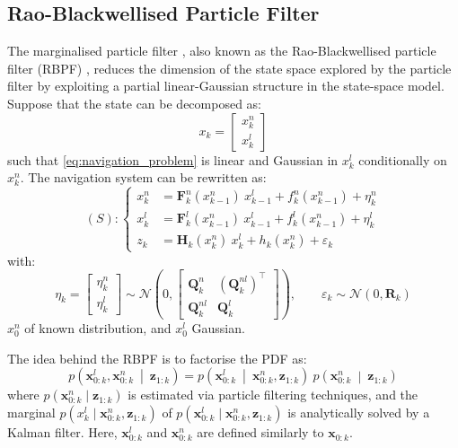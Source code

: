 \subsection{Rao-Blackwellised Particle Filter}

The marginalised particle filter \cite{bib:MPF}, also known as the Rao-Blackwellised particle filter (RBPF) \cite{bib:Rao-Blackwellisation,bib:RBPF}, reduces the dimension of the state space explored by the particle filter by exploiting a partial linear-Gaussian structure in the state-space model. Suppose that the state can be decomposed as:
\begin{equation}
	x_k=\begin{bmatrix}x_k^n\\x_k^l\end{bmatrix}
\end{equation}
such that \eqref{eq:navigation_problem} is linear and Gaussian in $x_k^l$ conditionally on $x_k^n$. The navigation system can be rewritten as:
\begin{equation}
	(S):\left\{\begin{aligned}
	x_k^n&=\mathbf{F}_k^n\left(x_{k-1}^n\right)\:x_{k-1}^l+f_k^n\left(x_{k-1}^n\right)+\eta_k^n\\
	x_k^l&=\mathbf{F}_k^l\left(x_{k-1}^n\right)\:x_{k-1}^l+f_k^l\left(x_{k-1}^n\right)+\eta_k^l\\
	z_k&=\mathbf{H}_k\left(x_k^n\right)\:x_k^l+h_k\left(x_k^n\right)+\varepsilon_k
	\end{aligned}\right.\label{eq:RBPF_model}
\end{equation}
with:
\begin{equation}
	\eta_k=\begin{bmatrix}\eta_k^n\\\eta_k^l\end{bmatrix}
	\sim\mathcal{N}\left(0,\begin{bmatrix}
	\mathbf{Q}_k^n&(\mathbf{Q}_k^{nl})^\top\\\mathbf{Q}_k^{nl}&\mathbf{Q}_k^l
	\end{bmatrix}\right),\qquad \varepsilon_k\sim\mathcal{N}(0,\mathbf{R}_k)
\end{equation}
$x_0^n$ of known distribution, and $x_0^l$ Gaussian.

The idea behind the RBPF is to factorise the PDF as:
\begin{equation}
	p\left(\mathbf{x}_{0:k}^l,\mathbf{x}_{0:k}^n\:\middle|\:\mathbf{z}_{1:k}\right)=p\left(\mathbf{x}_{0:k}^l\:\middle|\:\mathbf{x}_{0:k}^n,\mathbf{z}_{1:k}\right)\:p\left(\mathbf{x}_{0:k}^n\:\middle|\:\mathbf{z}_{1:k}\right)
\end{equation}
where $p(\mathbf{x}_{0:k}^n\mid\mathbf{z}_{1:k})$ is estimated via particle filtering techniques, and the marginal $p(x_k^l\mid\mathbf{x}_{0:k}^n,\mathbf{z}_{1:k})$ of $p(\mathbf{x}_{0:k}^l\mid\mathbf{x}_{0:k}^n,\mathbf{z}_{1:k})$ is analytically solved by a Kalman filter. Here, $\mathbf{x}_{0:k}^l$ and $\mathbf{x}_{0:k}^n$ are defined similarly to $\mathbf{x}_{0:k}$.


